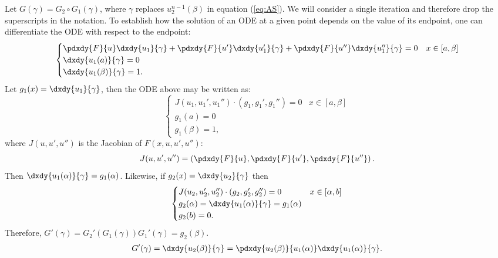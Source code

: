 \documentclass{book}
\begin{document}
Let $G(\gamma) = G_2 \circ G_1(\gamma)$, where $\gamma$ replaces $u^{n-1}_2(\beta)$ in equation (\ref{eq:AS}).
We will consider a single iteration and therefore drop the superscripts in the notation.
To establish how the solution of an ODE at a given point depends on the value of its endpoint, one can differentiate the ODE with respect to the endpoint:
\begin{align*}
\begin{cases} \pdxdy{F}{u} \dxdy{u_1}{\gamma} + \pdxdy{F}{u'} \dxdy{u_1'}{\gamma} + \pdxdy{F}{u''} \dxdy{u_1''}{\gamma} = 0 & x \in [a,\beta] \\
\dxdy{u_1(a)}{\gamma} = 0 \\
\dxdy{u_1(\beta)}{\gamma} = 1. \end{cases}
\end{align*}
Let $g_1(x) = \dxdy{u_1}{\gamma}$, then the ODE above may be written as:
\begin{equation*}
\begin{cases} J(u_1,u_1',u_1'') \cdot (g_1, g_1', g_1'') = 0 & x \in [a,\beta] \\ g_1(a) = 0 \\ g_1(\beta) = 1, \end{cases}
\end{equation*}
where $J(u,u',u'')$ is the Jacobian of $F(x,u,u',u'')$:
\begin{equation} \label{eq:Jacobian}
J(u,u',u'') = \left ( \pdxdy{F}{u}, \pdxdy{F}{u'}, \pdxdy{F}{u''} \right ) .
\end{equation}
Then $\dxdy{u_1(\alpha)}{\gamma} = g_1(\alpha)$.
Likewise, if $g_2(x) = \dxdy{u_2}{\gamma}$ then
\begin{equation*}
\begin{cases} J(u_2,u_2',u_2'') \cdot (g_2, g_2', g_2'') = 0 & x \in [\alpha,b] \\
g_2(\alpha) = \dxdy{u_1(\alpha)}{\gamma} = g_1(\alpha) \\ g_2(b) = 0 . \end{cases}
\end{equation*}
Therefore, $G'(\gamma) = G_2'(G_1(\gamma)) G_1'(\gamma) = g_2(\beta)$.
\begin{align*}
G'(\gamma) = \dxdy{u_2(\beta)}{\gamma} = \pdxdy{u_2(\beta)}{u_1(\alpha)} \dxdy{u_1(\alpha)}{\gamma} .
\end{align*}
\end{document}

